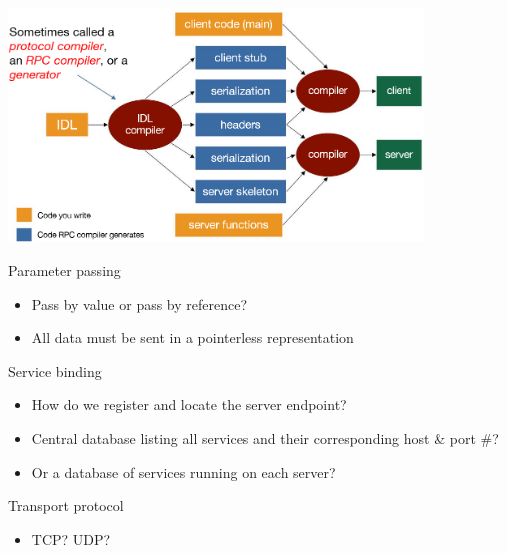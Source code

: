 \begin{slide}

	
	\includegraphics[width=110mm]{rpc-compiler.png}

\end{slide}

\begin{slide}

	
	Parameter passing
	\begin{itemize}
		\item Pass by value or pass by reference?
		\item All data must be sent in a pointerless representation
	\end{itemize}
	\bigskip
	
	Service binding
	\begin{itemize}
		\item How do we register and locate the server endpoint?
		\item Central database listing all services and their corresponding host \& port \#?
		\item Or a database of services running on each server?
	\end{itemize}
	\bigskip
	
	Transport protocol
	\begin{itemize}
		\item TCP? UDP? 
	\end{itemize}
	\bigskip
	
\end{slide}
	

